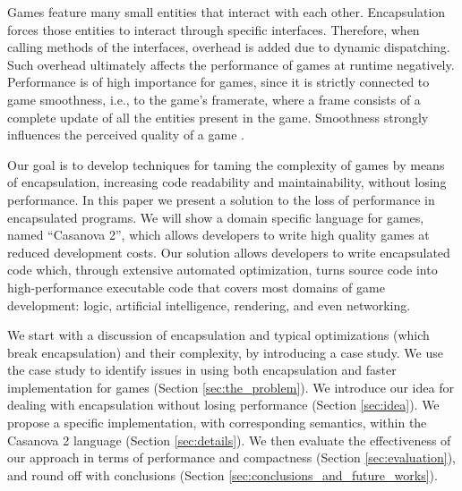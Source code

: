 Games feature many small entities that interact with each other. Encapsulation forces those entities to interact through specific interfaces. Therefore, when calling methods of the interfaces, overhead is added due to dynamic dispatching. Such overhead ultimately affects the performance of games at runtime negatively. Performance is of high importance for games, since it is strictly connected to game smoothness, i.e., to the game's framerate, where a frame consists of a complete update of all the entities present in the game. Smoothness strongly influences the perceived quality of a game \cite{claypool2009perspectives}.

Our goal is to develop techniques for taming the complexity of games by means of encapsulation, increasing code readability and maintainability, without losing performance.
In this paper we present a solution to the loss of performance in encapsulated programs. We will show a domain specific language for games, named ``Casanova 2'', which allows developers to write high quality games at reduced development costs. Our solution allows developers to write encapsulated code which, through extensive automated optimization, turns source code into high-performance executable code that covers most domains of game development: logic, artificial intelligence, rendering, and even networking.


We start with a discussion of encapsulation and typical optimizations (which break encapsulation) and their complexity, by introducing a case study. We use the case study to identify issues in using both encapsulation and faster implementation for games (Section \ref{sec:the_problem}). We introduce our idea for dealing with encapsulation without losing performance (Section \ref{sec:idea}). We propose a specific implementation, with corresponding semantics, within the Casanova 2 language (Section \ref{sec:details}). We then evaluate the effectiveness of our approach in terms of performance and compactness (Section \ref{sec:evaluation}), and round off with conclusions (Section \ref{sec:conclusions_and_future_works}). 